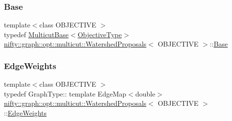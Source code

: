 \subsubsection{\texorpdfstring{Base}{Base}}
{\footnotesize\ttfamily template$<$class O\+B\+J\+E\+C\+T\+I\+VE $>$ \\
typedef \hyperlink{classnifty_1_1graph_1_1opt_1_1multicut_1_1MulticutBase}{Multicut\+Base}$<$\hyperlink{classnifty_1_1graph_1_1opt_1_1multicut_1_1WatershedProposals_a2ea604fcb16dc28bf52164ec5b3f232a}{Objective\+Type}$>$ \hyperlink{classnifty_1_1graph_1_1opt_1_1multicut_1_1WatershedProposals}{nifty\+::graph\+::opt\+::multicut\+::\+Watershed\+Proposals}$<$ O\+B\+J\+E\+C\+T\+I\+VE $>$\+::\hyperlink{classnifty_1_1graph_1_1opt_1_1multicut_1_1WatershedProposals_a5484630cc07bc37751c4262e40a059f8}{Base}}

\mbox{\label{classnifty_1_1graph_1_1opt_1_1multicut_1_1WatershedProposals_abd0739ab4f295cc667a246a878dfff43}} 
\subsubsection{\texorpdfstring{Edge\+Weights}{EdgeWeights}}
{\footnotesize\ttfamily template$<$class O\+B\+J\+E\+C\+T\+I\+VE $>$ \\
typedef Graph\+Type\+:: template Edge\+Map$<$double$>$ \hyperlink{classnifty_1_1graph_1_1opt_1_1multicut_1_1WatershedProposals}{nifty\+::graph\+::opt\+::multicut\+::\+Watershed\+Proposals}$<$ O\+B\+J\+E\+C\+T\+I\+VE $>$\+::\hyperlink{classnifty_1_1graph_1_1opt_1_1multicut_1_1WatershedProposals_abd0739ab4f295cc667a246a878dfff43}{Edge\+Weights}}

\mbox{\label{classnifty_1_1graph_1_1opt_1_1multicut_1_1WatershedProposals_a1b552b5ad2f22af891c4e83fc3b324cf}} 
